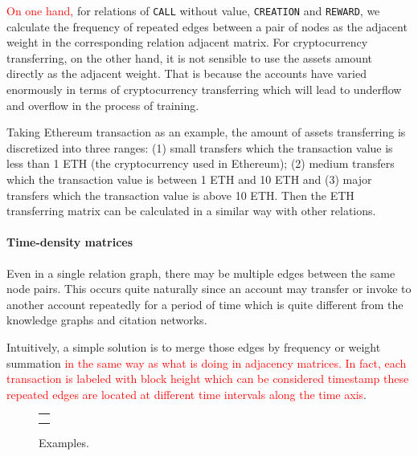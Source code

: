 \textcolor{red}{On one hand,} for relations of \texttt{CALL} without value, \texttt{CREATION} and \texttt{REWARD}, we calculate the frequency of repeated edges between a pair of nodes as the adjacent weight in the corresponding relation adjacent matrix. For cryptocurrency transferring, on the other hand, it is not sensible to use the assets amount directly as the adjacent weight. That is because the accounts have varied enormously in terms of cryptocurrency transferring which will lead to underflow and overflow in the process of training.

 Taking Ethereum transaction as an example, the amount of assets transferring is discretized into three ranges: (1) small transfers which the transaction value is less than 1 ETH (the cryptocurrency used in Ethereum); (2) medium transfers which the transaction value is between 1 ETH and 10 ETH and (3) major transfers which the transaction value is above 10 ETH. Then the ETH transferring matrix can be calculated in a similar way with other relations.



\paragraph{Time-density matrices}
Even in a single relation graph, there may be multiple edges between the same node pairs. This occurs quite naturally since an account may transfer or invoke to another account repeatedly for a period of time which is quite different from the knowledge graphs and citation networks.

Intuitively, a simple solution is to merge those edges by frequency or weight summation \textcolor{red}{in the same way as what is doing in adjacency matrices. In fact, each transaction is labeled with block height which can be considered timestamp these repeated edges are located at different time intervals along the time axis}. 
 
\begin{figure}[htbp]
\centering
\begin{tabular}{c}
	\subfigure[Time variance histogram of whole nodes.]{
		\label{fig:high_order}
    
	}\\
	\subfigure[Time variance histogram of hack\&phish nodes.]{
		\label{fig:asymmetric}
    
	}
\end{tabular}
\caption{Examples.}
\label{fig:time_std}
\end{figure}

